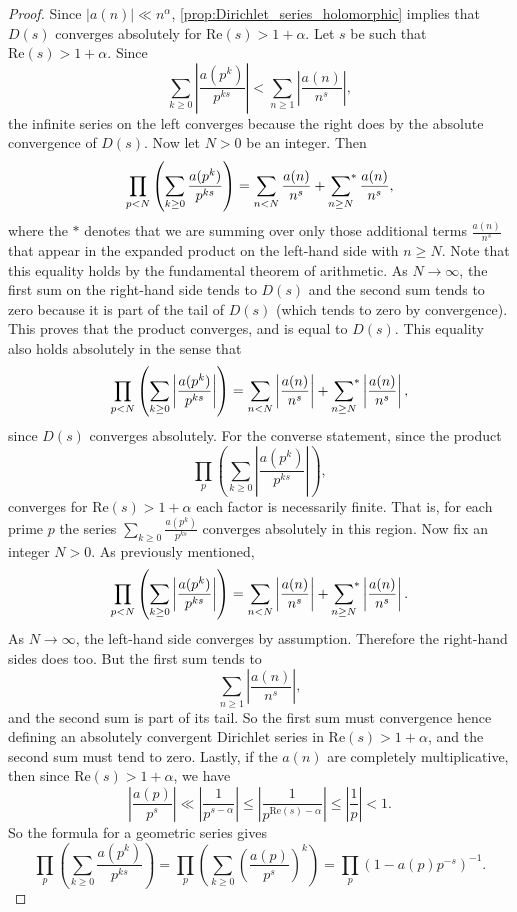 \documentclass[12pt]{book}
\theoremstyle{definition}\newframedtheorem{method}{Method}
\newcommand{\asum}{\sideset{}{^{\ast}}\sum}
\renewcommand{\a}{\alpha}
\newcommand{\<}{\langle}
\renewcommand{\>}{\rangle}
\renewcommand{\Re}{\mathrm{Re}}
\begin{document}
      \begin{proof}
          Since $|a(n)| \ll n^{\a}$, \cref{prop:Dirichlet_series_holomorphic} implies that $D(s)$ converges absolutely for $\Re(s) > 1+\a$. Let $s$ be such that $\Re(s) > 1+\a$. Since
          \[
            \sum_{k \ge 0}\left|\frac{a(p^{k})}{p^{ks}}\right| < \sum_{n \ge 1}\left|\frac{a(n)}{n^{s}}\right|,
          \]
          the infinite series on the left converges because the right does by the absolute convergence of $D(s)$. Now let $N > 0$ be an integer. Then
          \[
            \prod_{p < N}\left(\sum_{k \ge 0}\frac{a(p^{k})}{p^{ks}}\right) = \sum_{n < N}\frac{a(n)}{n^{s}}+\asum_{n \ge N}\frac{a(n)}{n^{s}},
          \]
          where the $\ast$ denotes that we are summing over only those additional terms $\frac{a(n)}{n^{s}}$ that appear in the expanded product on the left-hand side with $n \ge N$. Note that this equality holds by the fundamental theorem of arithmetic. As $N \to \infty$, the first sum on the right-hand side tends to $D(s)$ and the second sum tends to zero because it is part of the tail of $D(s)$ (which tends to zero by convergence). This proves that the product converges, and is equal to $D(s)$. This equality also holds absolutely in the sense that
          \[
            \prod_{p < N}\left(\sum_{k \ge 0}\left|\frac{a(p^{k})}{p^{ks}}\right|\right) = \sum_{n < N}\left|\frac{a(n)}{n^{s}}\right|+\asum_{n \ge N}\left|\frac{a(n)}{n^{s}}\right|,
          \]
          since $D(s)$ converges absolutely. For the converse statement, since the product
          \[
            \prod_{p}\left(\sum_{k \ge 0}\left|\frac{a(p^{k})}{p^{ks}}\right|\right),
          \]
          converges for $\Re(s) > 1+\a$ each factor is necessarily finite. That is, for each prime $p$ the series $\sum_{k \ge 0}\frac{a(p^{k})}{p^{ks}}$ converges absolutely in this region. Now fix an integer $N > 0$. As previously mentioned,
          \[
            \prod_{p < N}\left(\sum_{k \ge 0}\left|\frac{a(p^{k})}{p^{ks}}\right|\right) = \sum_{n < N}\left|\frac{a(n)}{n^{s}}\right|+\asum_{n \ge N}\left|\frac{a(n)}{n^{s}}\right|.
          \]
          As $N \to \infty$, the left-hand side converges by assumption. Therefore the right-hand sides does too. But the first sum tends to
          \[
            \sum_{n \ge 1}\left|\frac{a(n)}{n^{s}}\right|,
          \]
          and the second sum is part of its tail. So the first sum must convergence hence defining an absolutely convergent Dirichlet series in $\Re(s) > 1+\a$, and the second sum must tend to zero. Lastly, if the $a(n)$ are completely multiplicative, then since $\Re(s) > 1+\a$, we have
          \[
            \left|\frac{a(p)}{p^{s}}\right| \ll \left|\frac{1}{p^{s-\a}}\right| \le \left|\frac{1}{p^{\Re(s)-\a}}\right| \le \left|\frac{1}{p}\right| < 1.
          \]
          So the formula for a geometric series gives
          \[
            \prod_{p}\left(\sum_{k \ge 0}\frac{a(p^{k})}{p^{ks}}\right) = \prod_{p}\left(\sum_{k \ge 0}\left(\frac{a(p)}{p^{s}}\right)^{k}\right) = \prod_{p}(1-a(p)p^{-s})^{-1}.
          \]
      \end{proof}
\end{document}
